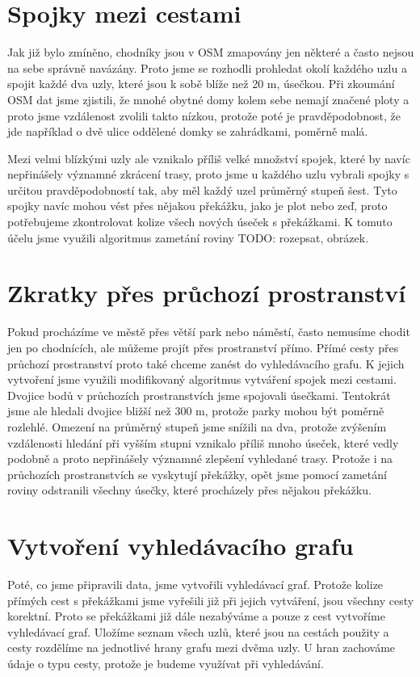 \section{Spojky mezi cestami}
Jak již bylo zmíněno, chodníky jsou v OSM zmapovány jen některé a často nejsou
na sebe správně navázány. Proto jsme se rozhodli prohledat okolí každého uzlu a
spojit každé dva uzly, které jsou k sobě blíže než 20 m, úsečkou. Při zkoumání
OSM dat jsme zjistili, že mnohé obytné domy kolem sebe nemají značené ploty a
proto jsme vzdálenost zvolili takto nízkou, protože poté je pravděpodobnost, že
jde například o dvě ulice oddělené domky se zahrádkami, poměrně malá.  

Mezi velmi blízkými uzly ale vznikalo příliš velké množství spojek, které by
navíc nepřinášely významné zkrácení trasy, proto jsme u každého uzlu vybrali
spojky s určitou pravděpodobností tak, aby měl každý uzel průměrný stupeň šest.
Tyto spojky navíc mohou vést přes nějakou překážku, jako je plot nebo zeď, proto
potřebujeme zkontrolovat kolize všech nových úseček s překážkami. K tomuto účelu
jsme využili algoritmus zametání roviny TODO: rozepsat, obrázek.  

\section{Zkratky přes průchozí prostranství}
Pokud procházíme ve městě přes větší park nebo náměstí, často nemusíme chodit
jen po chodnících, ale můžeme projít přes prostranství přímo. Přímé cesty přes
průchozí prostranství proto také chceme zanést do vyhledávacího grafu. K jejich
vytvoření jsme využili modifikovaný algoritmus vytváření spojek mezi cestami.
Dvojice bodů v průchozích prostranstvích jsme spojovali úsečkami. Tentokrát jsme
ale hledali dvojice bližší než 300 m, protože parky mohou být poměrně rozlehlé.
Omezení na průměrný stupeň jsme snížili na dva, protože zvýšením vzdálenosti
hledání při vyšším stupni vznikalo příliš mnoho úseček, které vedly podobně a
proto nepřinášely významné zlepšení vyhledané trasy. Protože i na průchozích
prostranstvích se vyskytují překážky, opět jsme pomocí zametání roviny
odstranili všechny úsečky, které procházely přes nějakou překážku.

\section{Vytvoření vyhledávacího grafu}
Poté, co jsme připravili data, jsme vytvořili vyhledávací graf. Protože kolize
přímých cest s překážkami jsme vyřešili již při jejich vytváření, jsou všechny
cesty korektní. Proto se překážkami již dále nezabýváme a pouze z cest vytvoříme
vyhledávací graf. Uložíme seznam všech uzlů, které jsou na cestách použity a
cesty rozdělíme na jednotlivé hrany grafu mezi dvěma uzly. U hran zachováme
údaje o typu cesty, protože je budeme využívat při vyhledávání.
